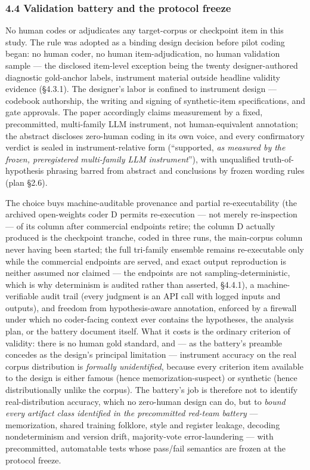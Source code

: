 \subsubsection{4.4 Validation battery and the protocol freeze}\label{validation-battery-and-the-protocol-freeze}

No human codes or adjudicates any target-corpus or checkpoint item in this study. The rule was adopted as a binding design decision before pilot coding began: no human coder, no human item-adjudication, no human validation sample --- the disclosed item-level exception being the twenty designer-authored diagnostic gold-anchor labels, instrument material outside headline validity evidence (\S{}4.3.1). The designer's labor is confined to instrument design --- codebook authorship, the writing and signing of synthetic-item specifications, and gate approvals. The paper accordingly claims measurement by a fixed, precommitted, multi-family LLM instrument, not human-equivalent annotation; the abstract discloses zero-human coding in its own voice, and every confirmatory verdict is sealed in instrument-relative form (``supported, \emph{as measured by the frozen, preregistered multi-family LLM instrument}''), with unqualified truth-of-hypothesis phrasing barred from abstract and conclusions by frozen wording rules (plan \S{}2.6).

The choice buys machine-auditable provenance and partial re-executability (the archived open-weights coder D permits re-execution --- not merely re-inspection --- of its column after commercial endpoints retire; the column D actually produced is the checkpoint tranche, coded in three runs, the main-corpus column never having been started; the full tri-family ensemble remains re-executable only while the commercial endpoints are served, and exact output reproduction is neither assumed nor claimed --- the endpoints are not sampling-deterministic, which is why determinism is audited rather than asserted, \S{}4.4.1), a machine-verifiable audit trail (every judgment is an API call with logged inputs and outputs), and freedom from hypothesis-aware annotation, enforced by a firewall under which no coder-facing context ever contains the hypotheses, the analysis plan, or the battery document itself. What it costs is the ordinary criterion of validity: there is no human gold standard, and --- as the battery's preamble concedes as the design's principal limitation --- instrument accuracy on the real corpus distribution is \emph{formally unidentified}, because every criterion item available to the design is either famous (hence memorization-suspect) or synthetic (hence distributionally unlike the corpus). The battery's job is therefore not to identify real-distribution accuracy, which no zero-human design can do, but to \emph{bound every artifact class identified in the precommitted red-team battery} --- memorization, shared training folklore, style and register leakage, decoding nondeterminism and version drift, majority-vote error-laundering --- with precommitted, automatable tests whose pass/fail semantics are frozen at the protocol freeze.

